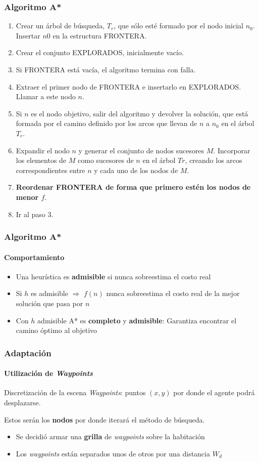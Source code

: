 \documentclass[hyperref={pdfpagelayout=SinglePage}]{beamer}
\begin{document}
\begin{frame}[plain]
\frametitle{Algoritmo A*}
\begin{enumerate}
\item Crear un árbol de búsqueda, $T_{r}$, que sólo esté formado por el nodo inicial $n_{0}$. Insertar $n{0}$ en la estructura FRONTERA.
\item Crear el conjunto EXPLORADOS, inicialmente vacío.
\item Si FRONTERA está vacía, el algoritmo termina con falla.
\item Extraer el primer nodo de FRONTERA e insertarlo en EXPLORADOS. Llamar a este nodo $n$.
\item Si $n$ es el nodo objetivo, salir del algoritmo y devolver la solución, que está formada por el camino definido por los arcos que llevan de $n$ a $n_{0}$ en el árbol $T_{r}$.
\item Expandir el nodo $n$ y generar el conjunto de nodos sucesores $M$. Incorporar los elementos de $M$ como sucesores de $n$ en el árbol $T{r}$, creando los arcos correspondientes entre $n$ y cada uno de los nodos de $M$.
\item \textbf{Reordenar FRONTERA de forma que primero estén los nodos de menor $f$}.
\item Ir al paso 3.
\end{enumerate}
\end{frame}

\begin{frame}
\frametitle{Algoritmo A*}
\framesubtitle{Comportamiento}
\begin{itemize}
	\item Una heurística es \textbf{admisible} si nunca sobreestima el costo real
	\item Si $h$ es admisible $\Rightarrow$ $f(n)$ nunca sobreestima el costo real de la mejor solución que pasa por $n$
	\item Con $h$ admisible A* es \textbf{completo} y \textbf{admisible}: Garantiza encontrar el camino óptimo al objetivo
\end{itemize}
\end{frame}

\begin{frame}
\frametitle{Adaptación}
\framesubtitle{Utilización de \textit{Waypoints}}
\begin{block}{Discretización de la escena}
\textit{Waypoints}: puntos $(x,y)$ por donde el agente podrá desplazarse. 

Estos serán los \textbf{nodos} por donde iterará el método de búsqueda.
\end{block}
\begin{itemize}
	\item Se decidió armar una \textbf{grilla} de \textit{waypoints} sobre la habitación
	\item Los \textit{waypoints} están separados unos de otros por una distancia $W_{d}$
\end{itemize}
\end{frame}
\end{document}
